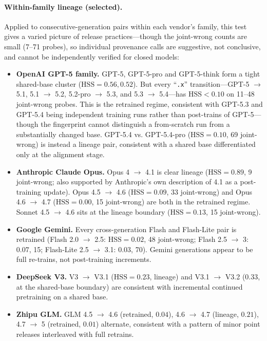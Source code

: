 \documentclass[11pt]{article}
\begin{document}
\paragraph{Within-family lineage (selected).}
Applied to consecutive-generation pairs within each vendor's family, this test gives a varied picture of release practices---though the joint-wrong counts are small (7--71 probes), so individual provenance calls are suggestive, not conclusive, and cannot be independently verified for closed models:
\begin{itemize}[leftmargin=*]
    \item \textbf{OpenAI GPT-5 family.} GPT-5, GPT-5-pro and GPT-5-think form a tight shared-base cluster ($\mathrm{HSS} = 0.56, 0.52$). But every ``\texttt{.x}'' transition---GPT-5 $\to$ 5.1, 5.1 $\to$ 5.2, 5.2-pro $\to$ 5.3, and 5.3 $\to$ 5.4---has $\mathrm{HSS} < 0.10$ on 11--48 joint-wrong probes. This is the retrained regime, consistent with GPT-5.3 and GPT-5.4 being independent training runs rather than post-trains of GPT-5---though the fingerprint cannot distinguish a from-scratch run from a substantially changed base. GPT-5.4 vs. GPT-5.4-pro ($\mathrm{HSS} = 0.10$, 69 joint-wrong) is instead a lineage pair, consistent with a shared base differentiated only at the alignment stage.
    \item \textbf{Anthropic Claude Opus.} Opus 4 $\to$ 4.1 is clear lineage ($\mathrm{HSS} = 0.89$, 9 joint-wrong; also supported by Anthropic's own description of 4.1 as a post-training update). Opus 4.5 $\to$ 4.6 ($\mathrm{HSS} = 0.09$, 33 joint-wrong) and Opus 4.6 $\to$ 4.7 ($\mathrm{HSS} = 0.00$, 15 joint-wrong) are both in the retrained regime. Sonnet 4.5 $\to$ 4.6 sits at the lineage boundary ($\mathrm{HSS} = 0.13$, 15 joint-wrong).
    \item \textbf{Google Gemini.} Every cross-generation Flash and Flash-Lite pair is retrained (Flash 2.0 $\to$ 2.5: $\mathrm{HSS} = 0.02$, 48 joint-wrong; Flash 2.5 $\to$ 3: $0.07$, 15; Flash-Lite 2.5 $\to$ 3.1: $0.03$, 70). Gemini generations appear to be full re-trains, not post-training increments.
    \item \textbf{DeepSeek V3.} V3 $\to$ V3.1 ($\mathrm{HSS} = 0.23$, lineage) and V3.1 $\to$ V3.2 ($0.33$, at the shared-base boundary) are consistent with incremental continued pretraining on a shared base.
    \item \textbf{Zhipu GLM.} GLM 4.5 $\to$ 4.6 (retrained, $0.04$), 4.6 $\to$ 4.7 (lineage, $0.21$), 4.7 $\to$ 5 (retrained, $0.01$) alternate, consistent with a pattern of minor point releases interleaved with full retrains.
\end{itemize}
\end{document}
